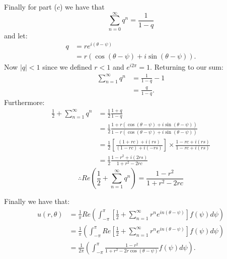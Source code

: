\begin{enumerate}
    Finally for part ($c$) we have that
    $$\sum_{n=0}^{\infty}q^n=\frac{1}{1-q}$$
    and let:
    \begin{align*}
        q
        &=re^{i(\theta-\psi)} \\
        &=r\left(\cos(\theta-\psi)+i\sin(\theta-\psi)\right).
    \end{align*}
    Now $|q|<1$ since we defined $r<1$ and $e^{i2\pi}=1$.
    Returning to our sum:
    \begin{align*}
        \sum_{n=1}^{\infty}q^n
        &=\frac{1}{1-q}-1 \\
        &=\frac{q}{1-q}.
    \end{align*}
    Furthermore:
    \begin{align*}
        \frac{1}{2}+\sum_{n=1}^{\infty}q^n
        &=\frac{1}{2}\frac{1+q}{1-q} \\
        &=\frac{1}{2}\frac{1+r(\cos(\theta-\psi)+i\sin(\theta-\psi))}
        {1-r(\cos(\theta-\psi)+i\sin(\theta-\psi))} \\
        &=\frac{1}{2}\left[\frac{(1+rc)+i(rs)}{(1-rc)+i(-rs)}\right]
        \times\frac{1-rc+i(rs)}{1-rc+i(rs)} \\
        &=\frac{1}{2}\frac{1-r^2+i(2rs)}{1+r^2-2rc}
    \end{align*}
    $$\therefore Re(\frac{1}{2}+\sum_{n=1}^{\infty}q^n)
    =\frac{1-r^2}{1+r^2-2rc}$$

    \newpage

    Finally we have that:
    \begin{align*}
        u(r,\theta)
        &=\frac{1}{\pi}Re\left(\int_{-\pi}^{\pi}
        \left[\frac{1}{2}+\sum_{n=1}^{\infty}r^ne^{in(\theta-\psi)}\right]f(\psi)d\psi\right) \\
        &=\frac{1}{\pi}\left(\int_{-\pi}^{\pi}
        Re\left[\frac{1}{2}+\sum_{n=1}^{\infty}r^ne^{in(\theta-\psi)}\right]f(\psi)d\psi\right) \\
        &=\frac{1}{2\pi}\left(\int_{-\pi}^{\pi}
        \frac{1-r^2}{1+r^2-2r\cos(\theta-\psi)}f(\psi)d\psi\right).
    \end{align*}
\end{enumerate}